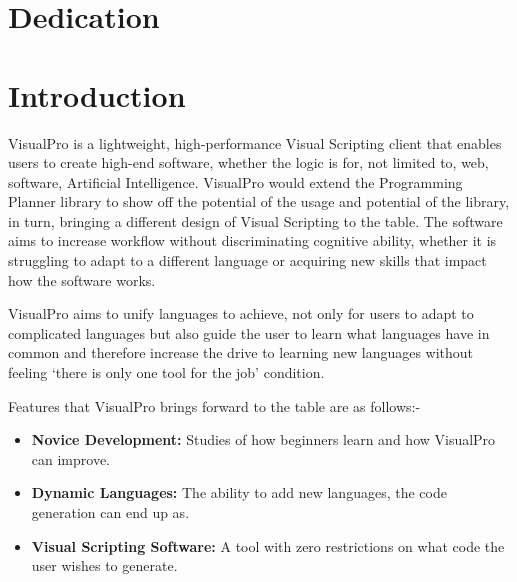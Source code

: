 \documentclass[12pt]{report} %
\begin{document}
\chapter*{Dedication}

\setcounter{page}{5}
	
	\vfill
	
	\newpage %
	\thispagestyle{empty}
	\mbox{}
	


\tableofcontents
\thispagestyle{fancy}

\newpage %
\thispagestyle{empty}
\mbox{}

\listoffigures
\thispagestyle{fancy}

\newpage %
\thispagestyle{empty}
\mbox{}

\listoftables
\thispagestyle{fancy}

\newpage %
\thispagestyle{empty}
\mbox{}


\clearpage
{} %

\chapter{Introduction}
	VisualPro is a lightweight, high-performance Visual Scripting client that enables users to create high-end software, whether the logic is for, not limited to, web, software, Artificial Intelligence. VisualPro would extend the Programming Planner library to show off the potential of the usage and potential of the library, in turn, bringing a different design of Visual Scripting to the table. The software aims to increase workflow without discriminating cognitive ability, whether it is struggling to adapt to a different language or acquiring new skills that impact how the software works. 

	VisualPro aims to unify languages to achieve, not only for users to adapt to complicated languages but also guide the user to learn what languages have in common and therefore increase the drive to learning new languages without feeling `there is only one tool for the job' condition.

	Features that VisualPro brings forward to the table are as follows:-
	\begin{itemize}
		\item \textbf{Novice Development:} Studies of how beginners learn and how VisualPro can improve.
		\item \textbf{Dynamic Languages:} The ability to add new languages, the code generation can end up as.
		\item \textbf{Visual Scripting Software:} A tool with zero restrictions on what code the user wishes to generate.
	\end{itemize}
\end{document}
